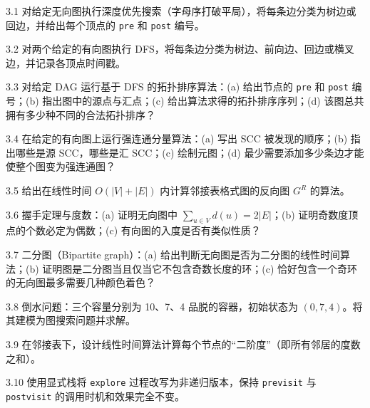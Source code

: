 \begin{exercise}{3.1}
对给定无向图执行深度优先搜索（字母序打破平局），将每条边分类为树边或回边，并给出每个顶点的 \texttt{pre} 和 \texttt{post} 编号。
\end{exercise}

\begin{exercise}{3.2}
对两个给定的有向图执行 DFS，将每条边分类为树边、前向边、回边或横叉边，并记录各顶点时间戳。
\end{exercise}

\begin{exercise}{3.3}
对给定 DAG 运行基于 DFS 的拓扑排序算法：(a) 给出节点的 \texttt{pre} 和 \texttt{post} 编号；(b) 指出图中的源点与汇点；(c) 给出算法求得的拓扑排序序列；(d) 该图总共拥有多少种不同的合法拓扑排序？
\end{exercise}

\begin{exercise}{3.4}
在给定的有向图上运行强连通分量算法：(a) 写出 SCC 被发现的顺序；(b) 指出哪些是源 SCC，哪些是汇 SCC；(c) 绘制元图；(d) 最少需要添加多少条边才能使整个图变为强连通图？
\end{exercise}

\begin{exercise}{3.5}
给出在线性时间 $O(|V| + |E|)$ 内计算邻接表格式图的反向图 $G^R$ 的算法。
\end{exercise}

\begin{exercise}{3.6}
握手定理与度数：(a) 证明无向图中 $\sum_{u \in V} d(u) = 2|E|$；(b) 证明奇数度顶点的个数必定为偶数；(c) 有向图的入度是否有类似性质？
\end{exercise}

\begin{exercise}{3.7}
二分图（Bipartite graph）：(a) 给出判断无向图是否为二分图的线性时间算法；(b) 证明图是二分图当且仅当它不包含奇数长度的环；(c) 恰好包含一个奇环的无向图最多需要几种颜色着色？
\end{exercise}

\begin{exercise}{3.8}
倒水问题：三个容量分别为 10、7、4 品脱的容器，初始状态为 $(0, 7, 4)$。将其建模为图搜索问题并求解。
\end{exercise}

\begin{exercise}{3.9}
在邻接表下，设计线性时间算法计算每个节点的“二阶度”（即所有邻居的度数之和）。
\end{exercise}

\begin{exercise}{3.10}
使用显式栈将 \texttt{explore} 过程改写为非递归版本，保持 \texttt{previsit} 与 \texttt{postvisit} 的调用时机和效果完全不变。
\end{exercise}

